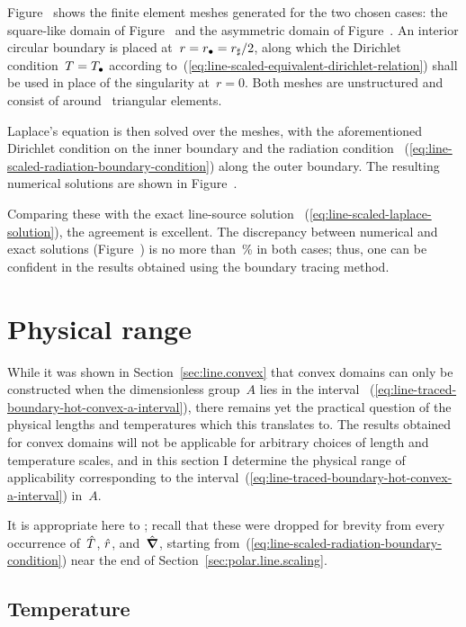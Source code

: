 Figure~\tbd{} shows the finite element meshes generated
for the two chosen cases:
the square-like domain of Figure~\tbd{}
and the asymmetric domain of Figure~\tbd.
An interior circular boundary is placed at~$r = r_\bullet = r_\sharp / 2$,
along which the Dirichlet condition~$T = T_\bullet$
according to~(\ref{eq:line-scaled-equivalent-dirichlet-relation})
shall be used
in place of the singularity at~$r = 0$.
Both meshes are unstructured
and consist of around \tbd~triangular elements.

Laplace's equation is then solved over the meshes,
with the aforementioned Dirichlet condition on the inner boundary
and the radiation condition~%
  (\ref{eq:line-scaled-radiation-boundary-condition})
along the outer boundary.
The resulting numerical solutions are shown in Figure~\tbd.

Comparing these with the exact line-source solution~%
  (\ref{eq:line-scaled-laplace-solution}),
the agreement is excellent.
The discrepancy between numerical and exact solutions
(Figure~\tbd)
is no more than~\tbd\% in both cases;
thus, one can be confident in the results obtained
using the boundary tracing method.

\section{Physical range}
\label{sec:line.physical}

While it was shown in Section~\ref{sec:line.convex} that
convex domains can only be constructed
when the dimensionless group~$A$ lies in the interval~%
  (\ref{eq:line-traced-boundary-hot-convex-a-interval}),
there remains yet the practical question of
the physical lengths and temperatures which this translates to.
The results obtained for convex domains
will not be applicable for arbitrary choices
of length and temperature scales,
and in this section I determine the physical range of applicability
corresponding to
the interval~(\ref{eq:line-traced-boundary-hot-convex-a-interval}) in~$A$.

It is appropriate here to ;
recall that these were dropped for brevity
from every occurrence of~$\hat{T}$, $\hat{r}$, and~$\mathop{}\!\hat{\mathop{}\!\boldsymbol{\mathrm{\nabla}}}$,
starting from~(\ref{eq:line-scaled-radiation-boundary-condition})
near the end of Section~\ref{sec:polar.line.scaling}.

\subsection{Temperature}
\label{sec:line.physical.temperature}

